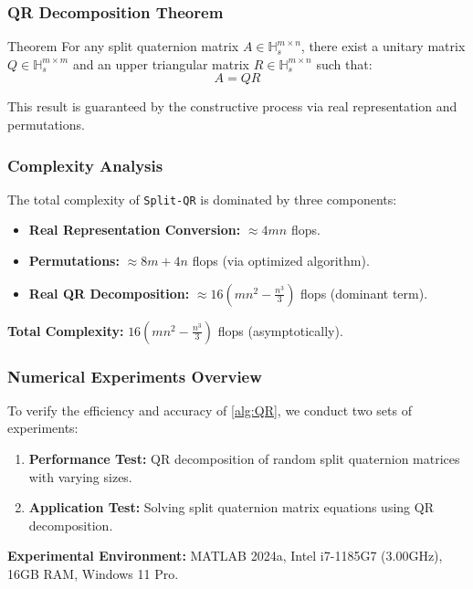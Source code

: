 \documentclass{beamer}
\begin{document}
\begin{frame}
    \frametitle{QR Decomposition Theorem}
    \begin{block}{Theorem}
        For any split quaternion matrix \( A \in \mathbb{H}_s^{m \times n} \), there exist a unitary matrix \( Q \in \mathbb{H}_s^{m \times m} \) and an upper triangular matrix \( R \in \mathbb{H}_s^{m \times n} \) such that:
        \[
        A = QR
        \]
    \end{block}
    This result is guaranteed by the constructive process via real representation and permutations.
\end{frame}

\begin{frame}
    \frametitle{Complexity Analysis}
    The total complexity of \texttt{Split-QR} is dominated by three components:
    \begin{itemize}
        \item \textbf{Real Representation Conversion:} \( \approx 4mn \) flops.
        \item \textbf{Permutations:} \( \approx 8m + 4n \) flops (via optimized algorithm).
        \item \textbf{Real QR Decomposition:} \( \approx 16\left(mn^2 - \frac{n^3}{3}\right) \) flops (dominant term).
    \end{itemize}
    \vspace{0.5cm}
    \textbf{Total Complexity:} \( \boxed{16\left(mn^2 - \frac{n^3}{3}\right)} \) flops (asymptotically).
\end{frame}


\begin{frame}
    \frametitle{Numerical Experiments Overview}
    To verify the efficiency and accuracy of \ref{alg:QR}, we conduct two sets of experiments:
    \begin{enumerate}
        \item \textbf{Performance Test:} QR decomposition of random split quaternion matrices with varying sizes.
        \item \textbf{Application Test:} Solving split quaternion matrix equations using QR decomposition.
    \end{enumerate}
    \vspace{0.3cm}
    \textbf{Experimental Environment:} MATLAB 2024a, Intel i7-1185G7 (3.00GHz), 16GB RAM, Windows 11 Pro.
\end{frame}
\end{document}
